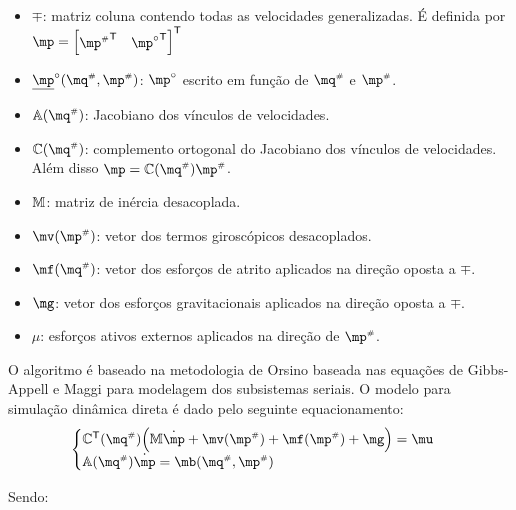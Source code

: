 \documentclass[a4paper,11pt,brazil,fleqn]{article}
\begin{document}
\begin{itemize}
\item $\mp$: matriz coluna contendo todas as velocidades generalizadas. \'E definida por $\mp = \begin{bmatrix} {\mp\ssh}^\msT & {\mp\cir}^\msT \end{bmatrix}^\msT $
\item $\underline{\mp}\cir(\mq\ssh,\mp\ssh)$: $\mp\cir$ escrito em fun\c{c}\~ao de $\mq\ssh$ e $\mp\ssh$.
\item $\mA(\mq\ssh)$: Jacobiano dos v\'inculos de velocidades.
\item $\mC(\mq\ssh)$: complemento ortogonal do Jacobiano dos v\'inculos de velocidades. Al\'em disso $\mp = \mC(\mq\ssh) \mp\ssh$.
\item $\mathbb{M}$: matriz de in\'ercia desacoplada.
\item $\mv(\mp\ssh)$: vetor dos termos girosc\'opicos desacoplados.
\item $\mf(\mq\ssh)$: vetor dos esfor\c{c}os de atrito aplicados na dire\c{c}\~ao oposta a $\mp$.
\item $\mg$: vetor dos esfor\c{c}os gravitacionais aplicados na dire\c{c}\~ao oposta a $\mp$.
\item $\mu $: esfor\c{c}os ativos externos aplicados na dire\c{c}\~ao de $\mp\ssh$.

\end{itemize}

O algoritmo \'e baseado na metodologia de Orsino baseada nas equa\c{c}\~oes de Gibbs-Appell e Maggi para modelagem dos subsistemas seriais. O modelo para simula\c{c}\~ao din\^amica direta \'e dado pelo seguinte equacionamento:
\begin{equation} \label{eq:DinamicaDireta}
\begin{cases}
\mC^\mathsf{T}(\mq\ssh) \Big( \mM \dot{\mp} + \mv(\mp\ssh) + \mf(\mp\ssh) + \mg \Big) = \mu \\
\mA(\mq\ssh) \dot{\mp} = \mb(\mq\ssh,\mp\ssh)
\end{cases}
\end{equation}

Sendo:
\end{document}
